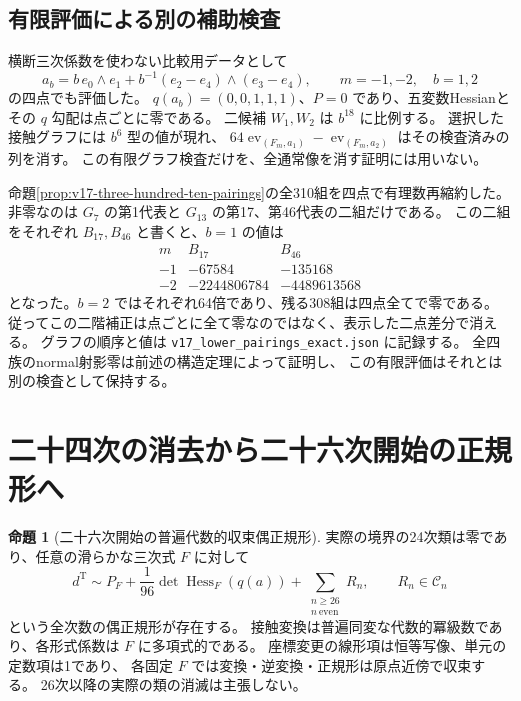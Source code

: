 \documentclass[a4paper,11pt]{ltjsarticle}
\theoremstyle{definition}
\newtheorem{theorem}{命題}[section]
\begin{document}
\subsection{有限評価による別の補助検査}

横断三次係数を使わない比較用データとして
\[
 a_b=b\,e_0\wedge e_1+b^{-1}(e_2-e_4)\wedge(e_3-e_4),
 \qquad m=-1,-2,\quad b=1,2
\]
の四点でも評価した。
$q(a_b)=(0,0,1,1,1)$、$P=0$ であり、五変数Hessianとその $q$ 勾配は点ごとに零である。
二候補 $W_1,W_2$ は $b^{18}$ に比例する。
選択した接触グラフには $b^6$ 型の値が現れ、
$64\operatorname{ev}_{(F_m,a_1)}-\operatorname{ev}_{(F_m,a_2)}$
はその検査済みの列を消す。
この有限グラフ検査だけを、全通常像を消す証明には用いない。

命題\ref{prop:v17-three-hundred-ten-pairings}の全310組を四点で有理数再縮約した。
非零なのは $G_7$ の第1代表と $G_{13}$ の第17、第46代表の二組だけである。
この二組をそれぞれ $B_{17},B_{46}$ と書くと、$b=1$ の値は
\[
\begin{array}{c|rr}
 m&B_{17}&B_{46}\\ \hline
 -1&-67584&-135168\\
 -2&-2244806784&-4489613568
\end{array}
\]
となった。$b=2$ ではそれぞれ64倍であり、残る308組は四点全てで零である。
従ってこの二階補正は点ごとに全て零なのではなく、表示した二点差分で消える。
グラフの順序と値は \nolinkurl{v17_lower_pairings_exact.json} に記録する。
全四族のnormal射影零は前述の構造定理によって証明し、
この有限評価はそれとは別の検査として保持する。




\section{二十四次の消去から二十六次開始の正規形へ}
\label{sec:v17-twenty-sixth-normal-form}

\begin{theorem}[二十六次開始の普遍代数的収束偶正規形]
\label{thm:v17-twenty-sixth-normal-form}
実際の境界の24次類は零であり、任意の滑らかな三次式 $F$ に対して
\begin{equation}\label{eq:v17-twenty-sixth-normal-form}
 \boxed{\displaystyle
 d^{\mathrm T}\sim
 P_F+\frac1{96}\det\operatorname{Hess}_F(q(a))
      +\sum_{\substack{n\ge26\\n\ \mathrm{even}}}R_n,
 \qquad R_n\in\mathcal C_n}
\end{equation}
という全次数の偶正規形が存在する。
接触変換は普遍同変な代数的冪級数であり、各形式係数は $F$ に多項式的である。
座標変更の線形項は恒等写像、単元の定数項は1であり、
各固定 $F$ では変換・逆変換・正規形は原点近傍で収束する。
26次以降の実際の類の消滅は主張しない。
\end{theorem}
\end{document}
